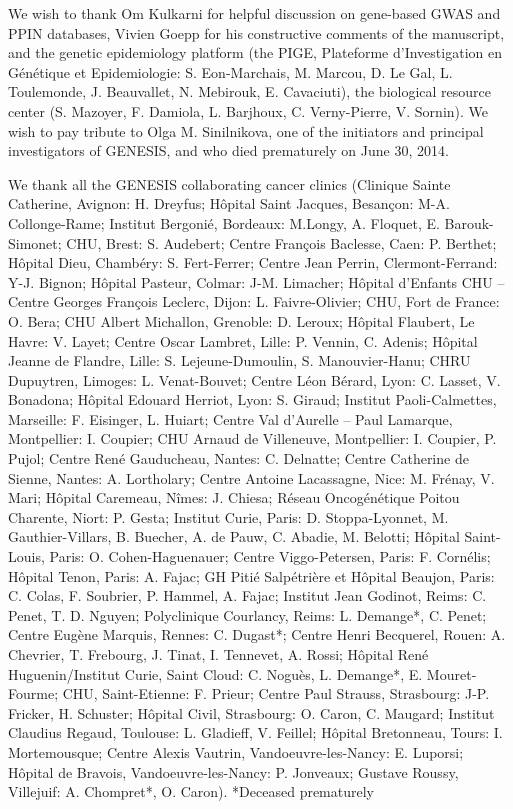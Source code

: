 \documentclass[10pt,letterpaper]{article}
\begin{document}
We wish to thank Om Kulkarni for helpful discussion on gene-based GWAS and PPIN databases, Vivien Goepp for his constructive comments of the manuscript, and the genetic epidemiology platform (the PIGE, Plateforme d'Investigation en Génétique et Epidemiologie: S. Eon-Marchais, M. Marcou, D. Le Gal, L. Toulemonde, J. Beauvallet, N. Mebirouk, E. Cavaciuti), the biological resource center (S. Mazoyer, F. Damiola, L. Barjhoux, C. Verny-Pierre, V. Sornin). We wish to pay tribute to Olga M. Sinilnikova, one of the initiators and principal investigators of GENESIS, and who died prematurely on June 30, 2014.

We thank all the GENESIS collaborating cancer clinics (Clinique Sainte Catherine, Avignon: H. Dreyfus; Hôpital Saint Jacques, Besançon: M-A. Collonge-Rame; Institut Bergonié, Bordeaux: M.Longy, A. Floquet, E. Barouk-Simonet; CHU, Brest: S. Audebert; Centre François Baclesse, Caen: P. Berthet; Hôpital Dieu, Chambéry: S. Fert-Ferrer; Centre Jean Perrin, Clermont-Ferrand: Y-J. Bignon; Hôpital Pasteur, Colmar: J-M. Limacher; Hôpital d’Enfants CHU – Centre Georges François Leclerc, Dijon: L. Faivre-Olivier; CHU, Fort de France: O. Bera; CHU Albert Michallon, Grenoble: D. Leroux; Hôpital Flaubert, Le Havre: V. Layet; Centre Oscar Lambret, Lille: P. Vennin, C. Adenis; Hôpital Jeanne de Flandre, Lille: S. Lejeune-Dumoulin, S. Manouvier-Hanu; CHRU Dupuytren, Limoges: L. Venat-Bouvet; Centre Léon Bérard, Lyon: C. Lasset, V. Bonadona; Hôpital Edouard Herriot, Lyon: S. Giraud; Institut Paoli-Calmettes, Marseille: F. Eisinger, L. Huiart; Centre Val d’Aurelle – Paul Lamarque, Montpellier: I. Coupier; CHU Arnaud de Villeneuve, Montpellier: I. Coupier, P. Pujol; Centre René Gauducheau, Nantes: C. Delnatte; Centre Catherine de Sienne, Nantes: A. Lortholary; Centre Antoine Lacassagne, Nice: M. Frénay, V. Mari; Hôpital Caremeau, Nîmes: J. Chiesa; Réseau Oncogénétique Poitou Charente, Niort: P. Gesta; Institut Curie, Paris: D. Stoppa-Lyonnet, M. Gauthier-Villars, B. Buecher, A. de Pauw, C. Abadie, M. Belotti; Hôpital Saint-Louis, Paris: O. Cohen-Haguenauer; Centre Viggo-Petersen, Paris: F. Cornélis; Hôpital Tenon, Paris: A. Fajac; GH Pitié Salpétrière et Hôpital Beaujon, Paris: C. Colas, F. Soubrier, P. Hammel, A. Fajac; Institut Jean Godinot, Reims: C. Penet, T. D. Nguyen; Polyclinique Courlancy, Reims: L. Demange*, C. Penet; Centre Eugène Marquis, Rennes: C. Dugast*; Centre Henri Becquerel, Rouen: A. Chevrier, T. Frebourg, J. Tinat, I. Tennevet, A. Rossi; Hôpital René Huguenin/Institut Curie, Saint Cloud: C. Noguès, L. Demange*, E. Mouret-Fourme; CHU, Saint-Etienne: F. Prieur; Centre Paul Strauss, Strasbourg: J-P. Fricker, H. Schuster; Hôpital Civil, Strasbourg: O. Caron, C. Maugard; Institut Claudius Regaud, Toulouse: L. Gladieff, V. Feillel; Hôpital Bretonneau, Tours: I. Mortemousque; Centre Alexis Vautrin, Vandoeuvre-les-Nancy: E. Luporsi; Hôpital de Bravois, Vandoeuvre-les-Nancy: P. Jonveaux; Gustave Roussy, Villejuif: A. Chompret*, O. Caron).
*Deceased prematurely
\end{document}
